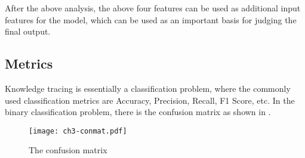 After the above analysis, the above four features can be used as additional input features for the model, which can be used as an important basis for judging the final output.
\subsection{Metrics}
Knowledge tracing is essentially a classification problem, where the commonly used classification metrics are Accuracy, Precision, Recall, F1 Score, etc. In the binary classification problem, there is the confusion matrix as shown in \figname{\ref{fig:ch3-conmat}}.
\begin{figure}[htbp!]
    \centering
    \texttt{[image: ch3-conmat.pdf]}
    \caption{The confusion matrix}\label{fig:ch3-conmat}
\end{figure}

